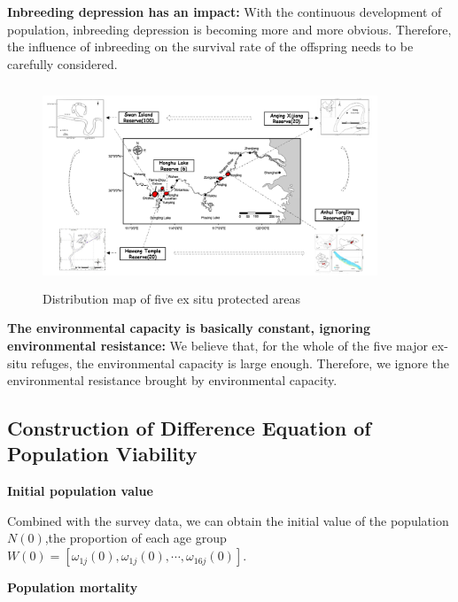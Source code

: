 \documentclass[12pt]{article}  %
\begin{document}
\textbf{Inbreeding depression has an impact: }
With the continuous development of population, inbreeding depression is becoming more and more obvious. Therefore, the influence of inbreeding on the survival rate of the offspring needs to be carefully considered.
\begin{figure}[htbp]%
	\small
	\centering
	\includegraphics[height=6cm,width=10cm]{figures/5prot.png}%
	\caption{Distribution map of five ex situ protected areas}%
\end{figure}

\textbf{The environmental capacity is basically constant, ignoring environmental resistance: }
We believe that, for the whole of the five major ex-situ refuges, the environmental capacity is large enough. Therefore, we ignore the environmental resistance brought by environmental capacity.


\subsection{Construction of Difference Equation of Population Viability}
\noindent%
\bullet
\textbf{ Initial population value}

Combined with the survey data, we can obtain the initial value of the population $N(0)$,the proportion of each age group $W(0)=\left[ {{\omega }_{1j}}(0),{{\omega }_{1j}}(0),\cdots ,{{\omega }_{16j}}(0) \right]$.

\noindent%
\Rightarrow 
\textbf{Population mortality}
\end{document}
